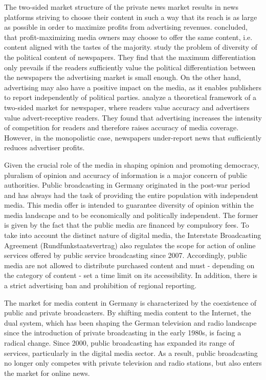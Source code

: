 \documentclass[12pt,a4paper,notitlepage]{article}
\begin{document}
The two-sided market structure of the private news market results in news platforms striving to choose their content in such a way that its reach is as large as possible in order to maximize profits from advertising revenues. \citet{steiner_program_1952} concluded, that profit-maximizing media owners may choose to offer the same content, i.e. content aligned with the tastes of the majority. \citet{gabszewicz_press_2001} study the problem of diversity of the political content of newspapers. They find that the maximum differentiation only prevails if the readers sufficiently value the political differentiation between the newspapers the advertising market is small enough. On the other hand, advertising may also have a positive impact on the media, as it enables publishers to report independently of political parties. \citet{ellman_what_2009} analyze a theoretical framework of a two-sided market for newspaper, where readers value accuracy and advertisers value advert-receptive readers. They found that advertising increases the intensity of competition for readers and therefore raises accuracy of media coverage. However, in the monopolistic case, newspapers under-report news that sufficiently reduces advertiser profits. 

Given the crucial role of the media in shaping opinion and promoting democracy, pluralism of opinion and accuracy of information is a major concern of public authorities. Public broadcasting in Germany originated in the post-war period and has always had the task of providing the entire population with independent media. This media offer is intended to guarantee diversity of opinion within the media landscape and to be economically and politically independent. The former is given by the fact that the public media are financed by compulsory fees. To take into account the distinct nature of digital media, the Interstate Broadcasting Agreement (Rundfunkstaatsvertrag) also regulates the scope for action of online services offered by public service broadcasting since 2007. Accordingly, public media are not allowed to distribute purchased content and must - depending on the category of content - set a time limit on its accessibility. In addition, there is a strict advertising ban and prohibition of regional reporting. 

The market for media content in Germany is characterized by the coexistence of public and private broadcasters. By shifting media content to the Internet, the dual system, which has been shaping the German television and radio landscape since the introduction of private broadcasting in the early 1980s, is facing a radical change. Since 2000, public broadcasting has expanded its range of services, particularly in the digital media sector. As a result, public broadcasting no longer only competes with private television and radio stations, but also enters the market for online news. 
\end{document}
